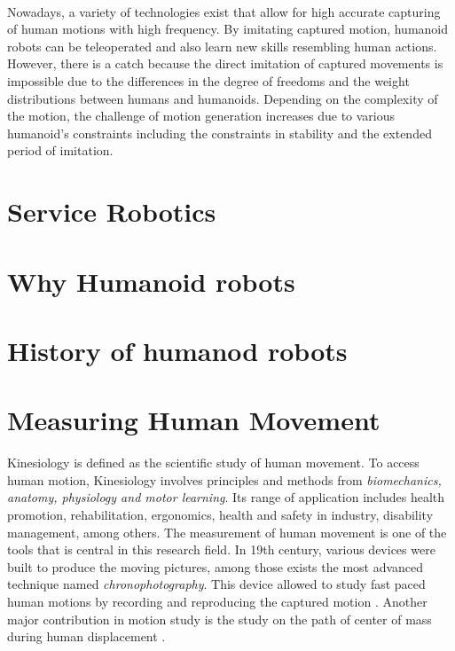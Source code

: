 ~

Nowadays, a variety of technologies exist that allow for high accurate capturing of human motions with high frequency. 
By imitating captured motion, humanoid robots can be teleoperated and also learn new skills resembling human actions. 
However, there is a catch because the direct imitation of captured movements is impossible due to the differences in 
the degree of freedoms and the weight distributions between humans and humanoids. Depending on the complexity of the 
motion, the challenge of motion generation increases due to various humanoid's constraints including the constraints in 
stability and the extended period of imitation. 
\section{Service Robotics}
\section{Why Humanoid robots}
\section{History of humanod robots}
\section{Measuring Human Movement}

Kinesiology is defined as the scientific study of human movement. To access human motion, Kinesiology involves principles
and methods from \textit{biomechanics, anatomy, physiology and motor learning}. Its range of application includes health
promotion, rehabilitation, ergonomics, health and safety in industry, disability management, among others. The 
measurement of human movement is one of the tools that is central in this research field. In 19th century, various 
devices were built to produce the moving pictures, among those exists the most advanced technique named 
\textit{chronophotography}. This device allowed to study fast paced human motions by recording and reproducing the 
captured motion \cite{RosenhahnBodo2008HMUM}. Another major contribution in motion study is the study on the path of 
center of mass during human displacement \cite{alma991010593879705596}.

